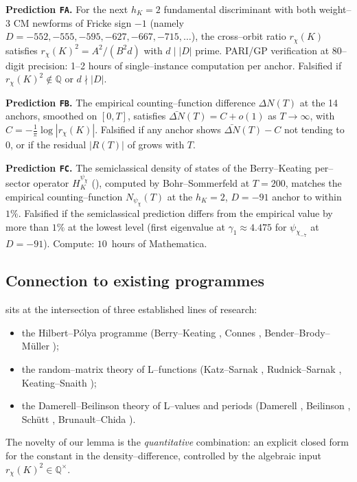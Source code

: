 \documentclass[11pt]{amsart}
\theoremstyle{definition}
\theoremstyle{remark}
\newcommand{\Q}{\mathbb{Q}}
\begin{document}
\textbf{Prediction \texttt{FA}.} For the next \(h_K = 2\) fundamental
discriminant with both weight--3 CM newforms of Fricke sign \(-1\)
(namely \(D = -552, -555, -595, -627, -667, -715, \ldots\)), the
cross--orbit ratio \(r_\chi(K)\) satisfies
\(r_\chi(K)^2 = A^2/(B^2 d)\) with \(d \mid |D|\) prime. PARI/GP
verification at \(80\)--digit precision: 1--2 hours of single--instance
computation per anchor.
Falsified if \(r_\chi(K)^2 \notin \Q\) or \(d \nmid |D|\).

\textbf{Prediction \texttt{FB}.} The empirical counting--function
difference \(\Delta N(T)\) at the 14 anchors, smoothed on \([0, T]\),
satisfies \(\bar{\Delta N}(T) = C + o(1)\) as \(T \to \infty\), with
\(C = -\tfrac{1}{\pi}\log|r_\chi(K)|\). Falsified if any anchor shows
\(\bar{\Delta N}(T) - C\) not tending to \(0\), or if the residual
\(|R(T)|\) of  grows with \(T\).

\textbf{Prediction \texttt{FC}.} The semiclassical density of states of
the Berry--Keating per--sector operator \(H_K^{\psi_\chi}\)
(), computed by Bohr--Sommerfeld at \(T = 200\),
matches the empirical counting--function \(N_{\psi_\chi}(T)\) at the
\(h_K = 2\), \(D = -91\) anchor to within \(1\%\). Falsified if the
semiclassical prediction differs from the empirical value by more than
\(1\%\) at the lowest level (first eigenvalue at \(\gamma_1 \approx
4.475\) for \(\psi_{\chi_{-7}}\) at \(D = -91\)).
Compute: \(10\)~hours of Mathematica.

\subsection{Connection to existing programmes}\label{ssec:connections}
 sits at the intersection of three established lines
of research:
\begin{itemize}
  \item the Hilbert--P\'olya programme (Berry--Keating
  \cite{BerryKeating1999a}, Connes \cite{Connes1999},
  Bender--Brody--M\"uller \cite{BBM2017});
  \item the random--matrix theory of L--functions (Katz--Sarnak
  \cite{KatzSarnak1999}, Rudnick--Sarnak
  \cite{RudnickSarnak1996}, Keating--Snaith \cite{KeatingSnaith2000});
  \item the Damerell--Beilinson theory of L--values and periods
  (Damerell \cite{Damerell1971}, Beilinson \cite{Beilinson1984},
  Schütt \cite{Schutt2008}, Brunault--Chida
  \cite{BrunaultChida2015}).
\end{itemize}
The novelty of our lemma is the \emph{quantitative} combination: an
explicit closed form for the constant in the density--difference,
controlled by the algebraic input
\(r_\chi(K)^2 \in \Q^\times\).
\end{document}

